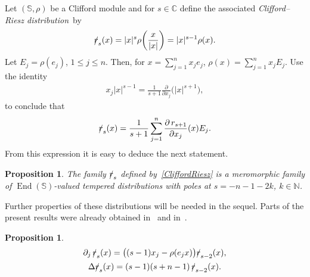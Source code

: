 \documentclass[10pt,a4paper]{amsart}
\DeclareMathOperator{\End}{End}
\newcommand{\fsl}[1]{{\slashed{#1}}} %
\numberwithin{equation}{section}
\newtheorem{prop}[theor]{Proposition}
\begin{document}
Let $(\mathbb S, \rho)$ be a Clifford module and for $s\in \mathbb C$ define the associated \emph{Clifford--Riesz distribu\-tion}~by
\begin{gather}\label{CliffordRiesz}
\fsl{r}_s(x) = \vert x\vert^s \rho\bigg(\frac{x}{\vert x\vert}\bigg)= \vert x\vert^{s-1} \rho(x) .
\end{gather}
Let $E_j = \rho(e_j)$, $1\leq j\leq n$. Then, for $x=\sum_{j=1}^n x_je_j$, $\rho(x) = \sum_{j=1}^n x_j E_j$. Use the identity
\begin{gather*}
x_j \vert x\vert^{s-1} = \frac{1}{s+1} \frac{\partial}{\partial x_j} \big(\vert x\vert^{s+1}\big) ,
\end{gather*}
to conclude that
\begin{gather*}
\fsl{r}_s(x) = \frac{1}{s+1} \sum_{j=1}^n \frac{\partial \,r_{s+1}}{\partial x_j} (x) E_j .
\end{gather*}
From this expression it is easy to deduce the next statement.
\begin{prop} The family $\fsl{r}_s$ defined by~\eqref{CliffordRiesz} is a meromorphic family of $\End(\mathbb S)$-valued tempered distributions with poles at $s=-n-1-2k$, $k\in \mathbb N$.
\end{prop}
Further properties of these distributions will be needed in the sequel. Parts of the present results were already obtained in~\cite{co} and in~\cite{fos}.
\begin{prop}
\begin{gather}%
\partial_j\, \fsl{r}_s(x) = \big((s-1)x_j-\rho(e_jx)\big) \fsl{r}_{s-2}(x),\label{partial1}
\\
\Delta \fsl{r}_s(x) = (s-1)(s+n-1)\, \fsl{r}_{s-2}(x).\label{partial2}
\end{gather}

\end{prop}
\end{document}
